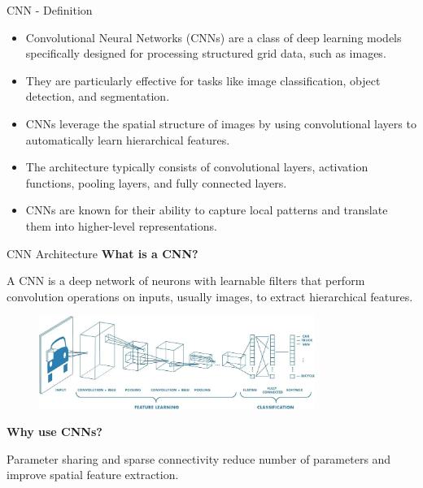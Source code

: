 \begin{frame}[allowframebreaks]{CNN - Definition}
\begin{itemize}
    \item Convolutional Neural Networks (CNNs) are a class of deep learning models specifically designed for processing structured grid data, such as images.
    \item They are particularly effective for tasks like image classification, object detection, and segmentation.
    \item CNNs leverage the spatial structure of images by using convolutional layers to automatically learn hierarchical features.
    \item The architecture typically consists of convolutional layers, activation functions, pooling layers, and fully connected layers.
    \item CNNs are known for their ability to capture local patterns and translate them into higher-level representations.
\end{itemize}
\end{frame}  

\begin{frame}{CNN Architecture}
    \textbf{What is a CNN?}
    
     A CNN is a deep network of neurons with learnable filters that perform convolution operations on inputs, usually images, to extract hierarchical features.
    
    \begin{figure}
    \centering
    \includegraphics[width=0.8\textwidth,height=0.4\textheight,keepaspectratio]{images/cnn/cnn-architecture.png}
    \end{figure}
    \newline
    \left

    \textbf{Why use CNNs?}
    
    Parameter sharing and sparse connectivity reduce number of parameters and improve spatial feature extraction.
\end{frame}

